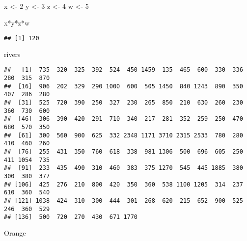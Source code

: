 \documentclass[
]{book}
\newenvironment{Shaded}{\begin{snugshade}}{\end{snugshade}}
\newcommand{\DecValTok}[1]{\textcolor[rgb]{0.00,0.00,0.81}{#1}}
\newcommand{\NormalTok}[1]{#1}
\newcommand{\OtherTok}[1]{\textcolor[rgb]{0.56,0.35,0.01}{#1}}
\newcommand{\SpecialCharTok}[1]{\textcolor[rgb]{0.00,0.00,0.00}{#1}}
\theoremstyle{definition}
\theoremstyle{definition}
\theoremstyle{definition}
\theoremstyle{definition}
\theoremstyle{remark}
\begin{document}
\begin{Shaded}
\begin{Highlighting}[]
\NormalTok{x }\OtherTok{\textless{}{-}} \DecValTok{2}
\NormalTok{y }\OtherTok{\textless{}{-}} \DecValTok{3}
\NormalTok{z }\OtherTok{\textless{}{-}} \DecValTok{4}
\NormalTok{w }\OtherTok{\textless{}{-}} \DecValTok{5}

\NormalTok{x}\SpecialCharTok{*}\NormalTok{y}\SpecialCharTok{*}\NormalTok{z}\SpecialCharTok{*}\NormalTok{w}
\end{Highlighting}
\end{Shaded}

\begin{verbatim}
## [1] 120
\end{verbatim}

\begin{Shaded}
\begin{Highlighting}[]
\NormalTok{rivers}
\end{Highlighting}
\end{Shaded}

\begin{verbatim}
##   [1]  735  320  325  392  524  450 1459  135  465  600  330  336  280  315  870
##  [16]  906  202  329  290 1000  600  505 1450  840 1243  890  350  407  286  280
##  [31]  525  720  390  250  327  230  265  850  210  630  260  230  360  730  600
##  [46]  306  390  420  291  710  340  217  281  352  259  250  470  680  570  350
##  [61]  300  560  900  625  332 2348 1171 3710 2315 2533  780  280  410  460  260
##  [76]  255  431  350  760  618  338  981 1306  500  696  605  250  411 1054  735
##  [91]  233  435  490  310  460  383  375 1270  545  445 1885  380  300  380  377
## [106]  425  276  210  800  420  350  360  538 1100 1205  314  237  610  360  540
## [121] 1038  424  310  300  444  301  268  620  215  652  900  525  246  360  529
## [136]  500  720  270  430  671 1770
\end{verbatim}

\begin{Shaded}
\begin{Highlighting}[]
\NormalTok{Orange}
\end{Highlighting}
\end{Shaded}
\end{document}
